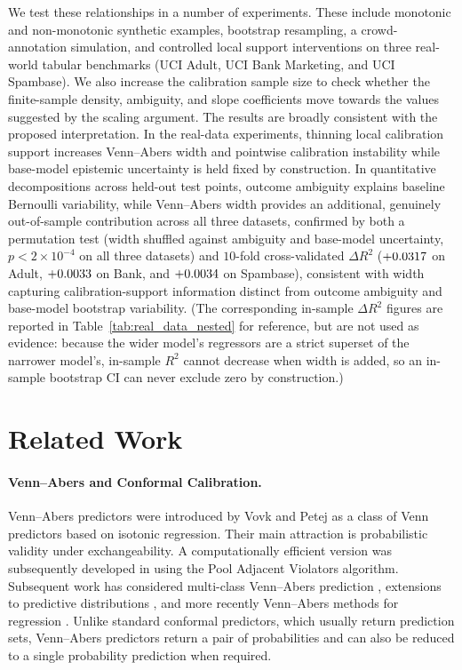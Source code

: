 \documentclass[11pt]{article}
\begin{document}
	We test these relationships in a number of experiments. These include monotonic and non-monotonic synthetic examples, bootstrap resampling, a crowd-annotation simulation, and controlled local support interventions on three real-world tabular benchmarks (UCI Adult, UCI Bank Marketing, and UCI Spambase). We also increase the calibration sample size to check whether the finite-sample density, ambiguity, and slope coefficients move towards the values suggested by the scaling argument. The results are broadly consistent with the proposed interpretation. In the real-data experiments, thinning local calibration support increases Venn--Abers width and pointwise calibration instability while base-model epistemic uncertainty is held fixed by construction. In quantitative decompositions across held-out test points, outcome ambiguity explains baseline Bernoulli variability, while Venn--Abers width provides an additional, genuinely out-of-sample contribution across all three datasets, confirmed by both a permutation test (width shuffled against ambiguity and base-model uncertainty, $p<2\times10^{-4}$ on all three datasets) and $10$-fold cross-validated $\Delta R^2$ ($+0.0317{}$ on Adult, $+0.0033{}$ on Bank, and $+0.0034{}$ on Spambase), consistent with width capturing calibration-support information distinct from outcome ambiguity and base-model bootstrap variability. (The corresponding in-sample $\Delta R^2$ figures are reported in Table~\ref{tab:real_data_nested} for reference, but are not used as evidence: because the wider model's regressors are a strict superset of the narrower model's, in-sample $R^2$ cannot decrease when width is added, so an in-sample bootstrap CI can never exclude zero by construction.)

\section{Related Work}
	\label{sec:related}

	\paragraph{Venn--Abers and Conformal Calibration.}
	Venn--Abers predictors were introduced by Vovk and Petej \cite{vovk2014} as a class of Venn predictors based on isotonic regression. Their main attraction is probabilistic validity under exchangeability. A computationally efficient version was subsequently developed in \cite{vovk2015} using the Pool Adjacent Violators algorithm. Subsequent work has considered multi-class Venn--Abers prediction \cite{manokhin2017multiclass}, extensions to predictive distributions \cite{nouretdinov2018ivapdist}, and more recently Venn--Abers methods for regression \cite{petej2026regressors}. Unlike standard conformal predictors, which usually return prediction sets, Venn--Abers predictors return a pair of probabilities and can also be reduced to a single probability prediction when required.
\end{document}
